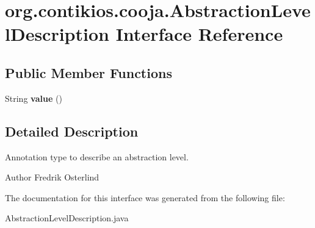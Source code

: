 \hypertarget{interfaceorg_1_1contikios_1_1cooja_1_1AbstractionLevelDescription}{\section{org.\-contikios.\-cooja.\-Abstraction\-Level\-Description Interface Reference}
\label{interfaceorg_1_1contikios_1_1cooja_1_1AbstractionLevelDescription}
}
\subsection*{Public Member Functions}
\begin{DoxyCompactItemize}
\item 
\hypertarget{interfaceorg_1_1contikios_1_1cooja_1_1AbstractionLevelDescription_acb933ba9d4bca4b664d9db598cd0d269}{String {\bfseries value} ()}\label{interfaceorg_1_1contikios_1_1cooja_1_1AbstractionLevelDescription_acb933ba9d4bca4b664d9db598cd0d269}

\end{DoxyCompactItemize}


\subsection{Detailed Description}
Annotation type to describe an abstraction level.

\begin{DoxyAuthor}{Author}
Fredrik Osterlind 
\end{DoxyAuthor}


The documentation for this interface was generated from the following file\-:\begin{DoxyCompactItemize}
\item 
Abstraction\-Level\-Description.\-java\end{DoxyCompactItemize}
